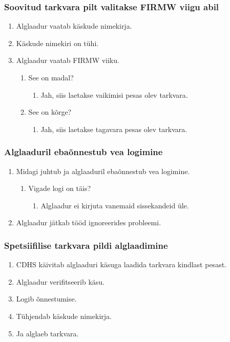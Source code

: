 \documentclass[12pt,a4paper]{article}
\begin{document}
\subsubsection{Soovitud tarkvara pilt valitakse FIRMW viigu abil}
\label{sec:usecase:fwselect}
\begin{enumerate}
	\item Alglaadur vaatab käskude nimekirja.
	\item Käskude nimekiri on tühi.
	\item Alglaadur vaatab FIRMW viiku.
		\begin{enumerate}
			\item See on madal?
				\begin{enumerate}
					\item Jah, siis laetakse vaikimisi pesas olev tarkvara.
				\end{enumerate}
			\item See on kõrge?
				\begin{enumerate}
					\item Jah, siis laetakse tagavara pesas olev tarkvara.
				\end{enumerate}
		\end{enumerate}
\end{enumerate}

\subsubsection{Alglaaduril ebaõnnestub vea logimine}
\begin{enumerate}
	\item Midagi juhtub ja alglaaduril ebaõnnestub vea logimine.
		\begin{enumerate}
			\item Vigade logi on täis?
				\begin{enumerate}
					\item Alglaadur ei kirjuta vanemaid sissekandeid üle.
				\end{enumerate}
		\end{enumerate}
	\item Alglaadur jätkab tööd ignoreerides probleemi.
\end{enumerate}

\subsubsection{Spetsiifilise tarkvara pildi alglaadimine}
\begin{enumerate}
	\item CDHS käivitab alglaaduri käsuga laadida tarkvara kindlast pesast.
	\item Alglaadur verifitseerib käsu.
	\item Logib õnnestumise.
	\item Tühjendab käskude nimekirja.
	\item Ja alglaeb tarkvara.
\end{enumerate}
\end{document}
